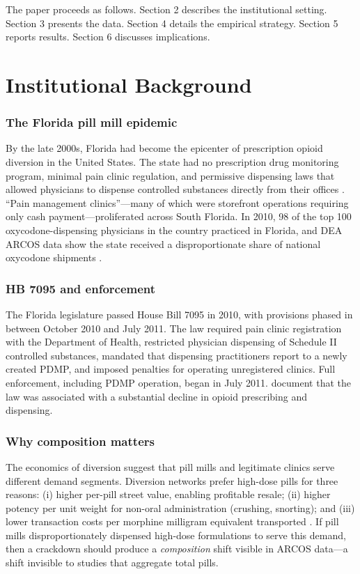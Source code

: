 \documentclass[12pt]{article}
\begin{document}
The paper proceeds as follows. Section 2 describes the institutional setting. Section 3 presents the data. Section 4 details the empirical strategy. Section 5 reports results. Section 6 discusses implications.


\section{Institutional Background}

\subsubsection*{The Florida pill mill epidemic} By the late 2000s, Florida had become the epicenter of prescription opioid diversion in the United States. The state had no prescription drug monitoring program, minimal pain clinic regulation, and permissive dispensing laws that allowed physicians to dispense controlled substances directly from their offices \citep{rutkow2015pdmp}. ``Pain management clinics''---many of which were storefront operations requiring only cash payment---proliferated across South Florida. In 2010, 98 of the top 100 oxycodone-dispensing physicians in the country practiced in Florida, and DEA ARCOS data show the state received a disproportionate share of national oxycodone shipments \citep{kolodny2015prescription}.

\subsubsection*{HB 7095 and enforcement} The Florida legislature passed House Bill 7095 in 2010, with provisions phased in between October 2010 and July 2011. The law required pain clinic registration with the Department of Health, restricted physician dispensing of Schedule II controlled substances, mandated that dispensing practitioners report to a newly created PDMP, and imposed penalties for operating unregistered clinics. Full enforcement, including PDMP operation, began in July 2011. \citet{rutkow2015pdmp} document that the law was associated with a substantial decline in opioid prescribing and dispensing.

\subsubsection*{Why composition matters} The economics of diversion suggest that pill mills and legitimate clinics serve different demand segments. Diversion networks prefer high-dose pills for three reasons: (i) higher per-pill street value, enabling profitable resale; (ii) higher potency per unit weight for non-oral administration (crushing, snorting); and (iii) lower transaction costs per morphine milligram equivalent transported \citep{alexander2015trends}. If pill mills disproportionately dispensed high-dose formulations to serve this demand, then a crackdown should produce a \textit{composition} shift visible in ARCOS data---a shift invisible to studies that aggregate total pills.
\end{document}
